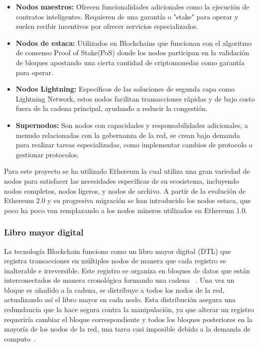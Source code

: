 \begin{itemize}
\item \textbf{Nodos maestros:} Ofrecen funcionalidades adicionales como la ejecución de contratos inteligentes. Requieren de una garantía o "stake" para operar y suelen recibir incentivos por ofrecer servicios especializados.

\item \textbf{Nodos de estaca:} Utilizados en Blockchains que funcionan con el algoritmo de consenso Proof of Stake(PoS) donde los nodos participan en la validación de bloques apostando una cierta cantidad de criptomonedas como garantía para operar.

\item \textbf{Nodos Lightning:} Específicos de las soluciones de segunda capa como Lightning Network, estos nodos facilitan transacciones rápidas y de bajo costo fuera de la cadena principal, ayudando a reducir la congestión.

\item \textbf{Supernodos:} Son nodos con capacidades y responsabilidades adicionales, a menudo relacionadas con la gobernanza de la red, se crean bajo demanda para realizar tareas especializadas, como implementar cambios de protocolo o gestionar protocolos.
\end{itemize}

Para este proyecto se ha utilizado Ethereum la cual utiliza una gran variedad de nodos para satisfacer las necesidades específicas de su ecosistema, incluyendo nodos completos, nodos ligeros, y nodos de archivo. A partir de la evolución de Ethereum 2.0 y su progresiva migración se han introducido los nodos estaca, que poco ha poco van remplazando a los nodos mineros utilizados en Ethereum 1.0.


\subsubsection{Libro mayor digital}

La tecnología Blockchain funciona como un libro mayor digital (DTL) que registra transacciones en múltiples nodos de manera que cada registro es inalterable e irreversible. 
Este registro se organiza en bloques de datos que están interconectados de manera cronológica formando una cadena ~\cite{wiki:DTL}.
Una vez un bloque es añadido a la cadena, se distribuye a todos los nodos de la red, actualizando así el libro mayor en cada nodo. Esta distribución asegura una redundancia que la hace segura contra la manipulación, ya que alterar un registro requeriría cambiar el bloque correspondiente y todos los bloques posteriores en la mayoría de los nodos de la red, una tarea casi imposible debido a la demanda de computo~\cite{BlockchainFuncionamiento}.

